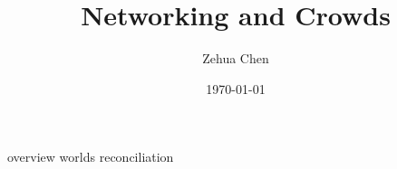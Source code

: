 \documentclass{../../shared/latex/notes}
\title{Networking and Crowds}
\author{Zehua Chen}
\date{\today}
\begin{document}
  \maketitle
  \tableofcontents

  {overview}
  {worlds}
  {reconciliation}

  \newpage
  \printglossaries
\end{document}
